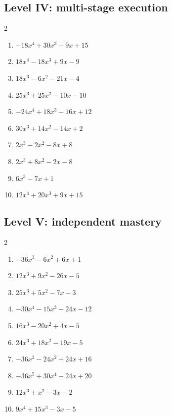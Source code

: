 \documentclass[11pt,oneside]{book}
\begin{document}
\subsection*{Level IV: multi-stage execution}
\begin{multicols}{2}
\begin{enumerate}[leftmargin=*,label=\textbf{\arabic*.},itemsep=0.65\baselineskip]
\item $ - 18 x^{4} + 30 x^{3} - 9 x + 15 $
\item $ 18 x^{4} - 18 x^{3} + 9 x - 9 $
\item $ 18 x^{3} - 6 x^{2} - 21 x - 4 $
\item $ 25 x^{3} + 25 x^{2} - 10 x - 10 $
\item $ - 24 x^{4} + 18 x^{3} - 16 x + 12 $
\item $ 30 x^{3} + 14 x^{2} - 14 x + 2 $
\item $ 2 x^{3} - 2 x^{2} - 8 x + 8 $
\item $ 2 x^{3} + 8 x^{2} - 2 x - 8 $
\item $ 6 x^{3} - 7 x + 1 $
\item $ 12 x^{4} + 20 x^{3} + 9 x + 15 $
\end{enumerate}
\end{multicols}
\subsection*{Level V: independent mastery}
\begin{multicols}{2}
\begin{enumerate}[leftmargin=*,label=\textbf{\arabic*.},itemsep=0.65\baselineskip]
\item $ - 36 x^{3} - 6 x^{2} + 6 x + 1 $
\item $ 12 x^{3} + 9 x^{2} - 26 x - 5 $
\item $ 25 x^{3} + 5 x^{2} - 7 x - 3 $
\item $ - 30 x^{4} - 15 x^{3} - 24 x - 12 $
\item $ 16 x^{3} - 20 x^{2} + 4 x - 5 $
\item $ 24 x^{3} + 18 x^{2} - 19 x - 5 $
\item $ - 36 x^{3} - 24 x^{2} + 24 x + 16 $
\item $ - 36 x^{5} + 30 x^{4} - 24 x + 20 $
\item $ 12 x^{3} + x^{2} - 3 x - 2 $
\item $ 9 x^{4} + 15 x^{3} - 3 x - 5 $
\end{enumerate}
\end{multicols}
\end{document}
